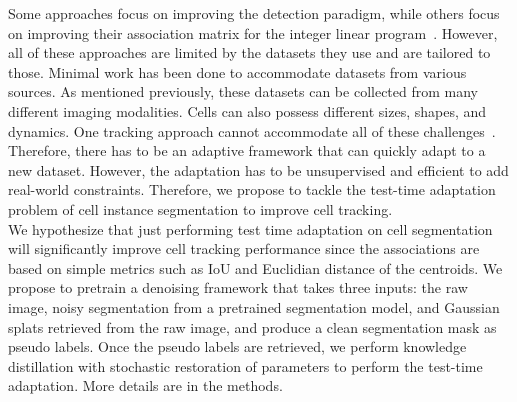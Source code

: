 Some approaches focus on improving the detection paradigm, while others focus on improving their association matrix for the integer linear program~\cite{mavska2023cell}. However, all of these approaches are limited by the datasets they use and are tailored to those. Minimal work has been done to accommodate datasets from various sources. As mentioned previously, these datasets can be collected from many different imaging modalities. Cells can also possess different sizes, shapes, and dynamics. One tracking approach cannot accommodate all of these challenges~\cite{chen2024cmtt}. Therefore, there has to be an adaptive framework that can quickly adapt to a new dataset. However, the adaptation has to be unsupervised and efficient to add real-world constraints. Therefore, we propose to tackle the test-time adaptation problem of cell instance segmentation to improve cell tracking.\\

We hypothesize that just performing test time adaptation on cell segmentation will significantly improve cell tracking performance since the associations are based on simple metrics such as IoU and Euclidian distance of the centroids. We propose to pretrain a denoising framework that takes three inputs: the raw image, noisy segmentation from a pretrained segmentation model, and Gaussian splats retrieved from the raw image, and produce a clean segmentation mask as pseudo labels. Once the pseudo labels are retrieved, we perform knowledge distillation with stochastic restoration of parameters to perform the test-time adaptation. More details are in the methods.   
